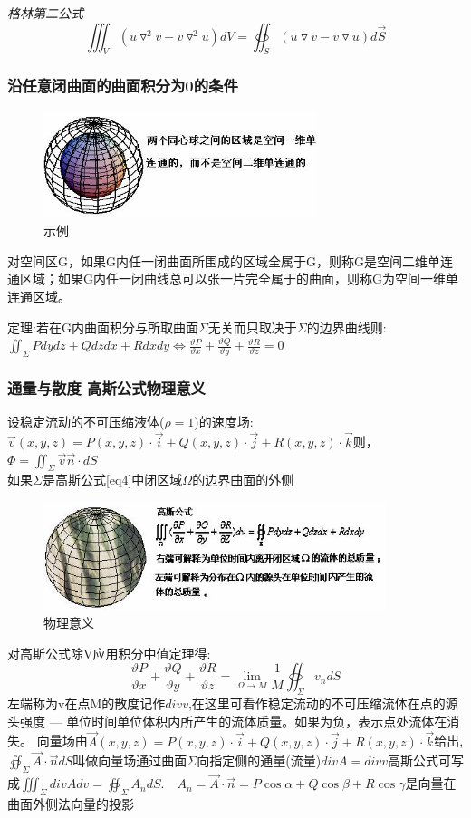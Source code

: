 \documentclass[10pt, a4paper, oneside]{ctexart}
\begin{document}
\begin{sloppypar}
	\emph{
		格林第二公式
		$$
			\iiint_V(u \triangledown ^2 v - v  \triangledown ^2 u)dV = \oiint_S(u \triangledown  v - v  \triangledown  u)d\overrightarrow{S}
		$$
	}

	\subsubsection{沿任意闭曲面的曲面积分为0的条件}
	\begin{figure}[htbp]
		\centering
		\includegraphics[width=8cm]{image201.jpg}
		\caption{示例}
	\end{figure}
	对空间区G，如果G内任一闭曲面所围成的区域全属于G，则称G是空间二维单连通区域；如果G内任一闭曲线总可以张一片完全属于的曲面，则称G为空间一维单连通区域。

	定理:若在G内曲面积分与所取曲面$\Sigma$无关而只取决于$\Sigma$的边界曲线则:$\iint_\Sigma Pdydz + Qdzdx + Rdxdy\Leftrightarrow\frac{\vartheta P}{\vartheta x}+\frac{\vartheta Q}{\vartheta y}+\frac{\vartheta R}{\vartheta z}=0$

	\subsubsection{通量与散度 高斯公式物理意义}
	设稳定流动的不可压缩液体($\rho = 1$)的速度场:$\overrightarrow{v}(x,y,z)= P(x,y,z)\cdot \overrightarrow{i}+Q(x,y,z)\cdot \overrightarrow{j}+R(x,y,z)\cdot \overrightarrow{k}$则，
	$\Phi = \iint_\Sigma \overrightarrow{v}\overrightarrow{n}\cdot dS$\\如果$\Sigma$是高斯公式\eqref{eq4}中闭区域$\Omega$的边界曲面的外侧
	\begin{figure}[htbp]
		\centering
		\includegraphics[width=10cm]{image233.jpg}
		\caption{物理意义}
	\end{figure}
	对高斯公式除V应用积分中值定理得:$$\frac{\vartheta P}{\vartheta x} + \frac{\vartheta Q}{\vartheta y} + \frac{\vartheta R}{\vartheta z} = \lim_{\Omega \to M}\frac{1}{M}\oiint_\Sigma v_n dS$$
	左端称为v在点M的散度记作$div v$,在这里可看作稳定流动的不可压缩流体在点的源头强度 — 单位时间单位体积内所产生的流体质量。如果为负，表示点处流体在消失。
	向量场由$\overrightarrow{A}(x,y,z)= P(x,y,z)\cdot \overrightarrow{i}+Q(x,y,z)\cdot \overrightarrow{j}+R(x,y,z)\cdot \overrightarrow{k}$给出,$\oiint_\Sigma \overrightarrow{A}\cdot\overrightarrow{n}dS$叫做向量场通过曲面$\Sigma$向指定侧的通量(流量)$div A = div v$高斯公式可写成$\iiint_\Sigma div A dv = \oiint_\Sigma A_n dS .\quad A_n = \overrightarrow{A}\cdot\overrightarrow{n}=P\cos\alpha + Q\cos \beta + R\cos\gamma$是向量在曲面外侧法向量的投影

\end{sloppypar}
\end{document}
